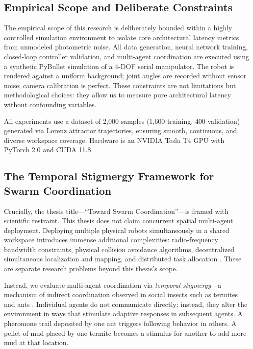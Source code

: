 \documentclass[12pt,a4paper,oneside]{report}
\begin{document}
\subsection{Empirical Scope and Deliberate Constraints}
\label{subsec:empirical_scope}

The empirical scope of this research is deliberately bounded within a highly controlled simulation environment to isolate core architectural latency metrics from unmodeled photometric noise. All data generation, neural network training, closed-loop controller validation, and multi-agent coordination are executed using a synthetic PyBullet simulation of a 4-DOF serial manipulator. The robot is rendered against a uniform background; joint angles are recorded without sensor noise; camera calibration is perfect. These constraints are not limitations but methodological choices: they allow us to measure pure architectural latency without confounding variables.

All experiments use a dataset of 2,000 samples (1,600 training, 400 validation) generated via Lorenz attractor trajectories, ensuring smooth, continuous, and diverse workspace coverage. Hardware is an NVIDIA Tesla T4 GPU with PyTorch 2.0 and CUDA 11.8.
\subsection{The Temporal Stigmergy Framework for Swarm Coordination}
\label{subsec:temporal_stigmergy_framework}

Crucially, the thesis title---``Toward Swarm Coordination''---is framed with scientific restraint. This thesis does not claim concurrent spatial multi-agent deployment. Deploying multiple physical robots simultaneously in a shared workspace introduces immense additional complexities: radio-frequency bandwidth constraints, physical collision avoidance algorithms, decentralized simultaneous localization and mapping, and distributed task allocation \cite{matsuki2024gaussian, keetha2024splattam}. These are separate research problems beyond this thesis's scope.

Instead, we evaluate multi-agent coordination via \textit{temporal stigmergy}---a mechanism of indirect coordination observed in social insects such as termites and ants \cite{bongard2006resilient}. Individual agents do not communicate directly; instead, they alter the environment in ways that stimulate adaptive responses in subsequent agents. A pheromone trail deposited by one ant triggers following behavior in others. A pellet of mud placed by one termite becomes a stimulus for another to add more mud at that location.
\end{document}
